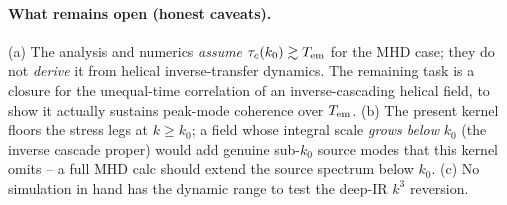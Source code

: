 \paragraph{What remains open (honest caveats).}
(a) The analysis and numerics \emph{assume} $\tau_c(k_0)\gtrsim T_{\rm em}$ for the MHD case; they
do not \emph{derive} it from helical inverse-transfer dynamics. The remaining task is a closure
for the unequal-time correlation of an inverse-cascading helical field, to show it actually
sustains peak-mode coherence over $T_{\rm em}$. (b) The present kernel floors the stress legs at
$k\ge k_0$; a field whose integral scale \emph{grows below} $k_0$ (the inverse cascade proper)
would add genuine sub-$k_0$ source modes that this kernel omits -- a full MHD calc should extend
the source spectrum below $k_0$. (c) No simulation in hand has the dynamic range to test the
deep-IR $k^3$ reversion.
